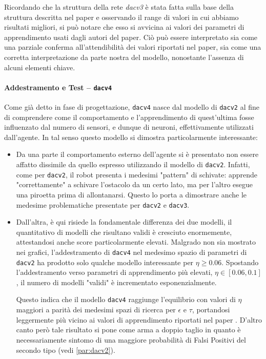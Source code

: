 Ricordando che la struttura della rete \textit{dacv3} è stata fatta sulla base della struttura descritta nel paper \cite{verschure1992distributed} e osservando il range di valori in cui abbiamo risultati migliori, si può notare che esso si avvicina ai valori dei parametri di apprendimento usati dagli autori del paper. Ciò può essere interpretato sia come una parziale conferma all'attendibilità dei valori riportati nel paper, sia come una corretta interpretazione da parte nostra del modello, nonostante l'assenza di alcuni elementi chiave. 

\newpage

\paragraph{Addestramento e Test -- \texttt{dacv4}}\label{par:dacv4}\hfill

Come già detto in fase di progettazione, \texttt{dacv4} nasce dal modello di \texttt{dacv2} al fine di comprendere come il comportamento e l'apprendimento di quest'ultima fosse influenzato dal numero di sensori, e dunque di neuroni, effettivamente utilizzati dall'agente. In tal senso questo modello si dimostra particolarmente interessante:

\begin{itemize}
    \item Da una parte il comportamento esterno dell'agente si è presentato non essere affatto dissimile da quello espresso utilizzando il modello di \texttt{dacv2}. Infatti, come per \texttt{dacv2}, il robot presenta i medesimi "pattern" di schivate: apprende "correttamente" a schivare l'ostacolo da un certo lato, ma per l'altro esegue una piroetta prima di allontanarsi. Questo lo porta a dimostrare anche le medesime problematiche presentate per \texttt{dacv2} e \texttt{dacv3}.
    
    \item Dall'altra, è qui risiede la fondamentale differenza dei due modelli, il quantitativo di modelli che risultano validi è cresciuto enormemente, attestandosi anche score particolarmente elevati. Malgrado non sia mostrato nei grafici, l'addestramento di \texttt{dacv4} nel medesimo spazio di parametri di \texttt{dacv2} ha prodotto solo qualche modello interessante per $\eta \ge 0.06$. Spostando l'addestramento verso parametri di apprendimento più elevati, $\eta \in [0.06, 0.1]$, il numero di modelli "validi" è incrementato esponenzialmente.
    
    Questo indica che il modello \texttt{dacv4} raggiunge l'equilibrio con valori di $\eta$ maggiori a parità dei medesimi spazi di ricerca per $\epsilon$ e $\tau$, portandosi leggermente più vicino ai valori di apprendimento riportati nel paper \cite{verschure1992distributed}. D'altro canto però tale risultato si pone come arma a doppio taglio in quanto è necessariamente sintomo di una maggiore probabilità di Falsi Positivi del secondo tipo (vedi \ref{par:dacv2}).
\end{itemize}

